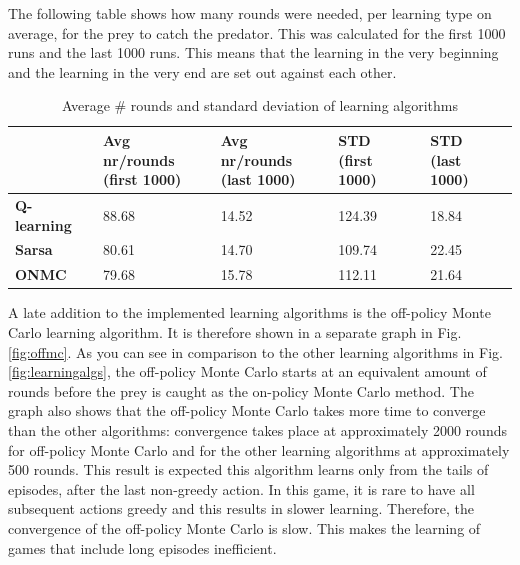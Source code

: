 \documentclass{article}
\begin{document}

The following table shows how many rounds were needed, per learning type on average, for the prey to catch the predator. This was calculated for the first 1000 runs  and the last 1000 runs. This means that the learning in the very beginning and the learning in the very end are set out against each other.

\begin{table}[h]
\begin{center}
\begin{tabular}{| l | l | l | l | l |}
\hline
 & \parbox{2cm}{\textbf{Avg nr/rounds\\ (first 1000)}} & \parbox{2cm}{\textbf{Avg nr/rounds\\ (last 1000)}} & \parbox{2cm}{\textbf{STD\\ (first 1000)}} & \parbox{2cm}{\textbf{STD\\ (last 1000)}} \\
\hline
\textbf{Q-learning} & 88.68 & 14.52 & 124.39 & 18.84 \\
\hline
\textbf{Sarsa} & 80.61 & 14.70 & 109.74 & 22.45 \\
\hline
\textbf{ONMC} & 79.68 & 15.78 & 112.11 & 21.64 \\
\hline
\end{tabular}
\caption{Average \# rounds and standard deviation of learning algorithms}
\end{center}
\end{table}

A late addition to the implemented learning algorithms is the off-policy Monte Carlo learning algorithm. It is therefore shown in a separate graph in Fig. \ref{fig:offmc}. As you can see in comparison to the other learning algorithms in Fig. \ref{fig:learningalgs}, the off-policy Monte Carlo starts at an equivalent amount of rounds before the prey is caught as the on-policy Monte Carlo method. The graph also shows that the off-policy Monte Carlo takes more time to converge than the other algorithms: convergence takes place at approximately 2000 rounds for off-policy Monte Carlo and for the other learning algorithms at approximately 500 rounds. This result is expected this algorithm learns only from the tails of episodes, after the last non-greedy action. In this game, it is rare to have all subsequent actions greedy and this results in slower learning. Therefore, the convergence of the off-policy Monte Carlo is slow. This makes the learning of games that include long episodes inefficient.
\end{document}
